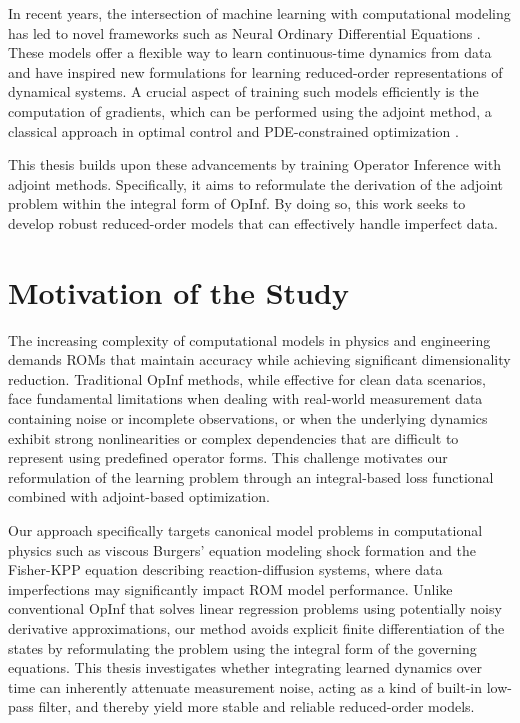 In recent years, the intersection of machine learning with computational modeling has led to novel frameworks such as Neural Ordinary Differential Equations \cite{chen2018neural}. These models offer a flexible way to learn continuous-time dynamics from data and have inspired new formulations for learning reduced-order representations of dynamical systems. A crucial aspect of training such models efficiently is the computation of gradients, which can be performed using the adjoint method, a classical approach in optimal control and PDE-constrained optimization \cite{Antil2018,bradley2024pde}.

This thesis builds upon these advancements by training Operator Inference with adjoint methods. Specifically, it aims to reformulate the derivation of the adjoint problem within the integral form of OpInf. By doing so, this work seeks to develop robust reduced-order models that can effectively handle imperfect data.

\section{Motivation of the Study}

The increasing complexity of computational models in physics and engineering demands ROMs that maintain accuracy while achieving significant dimensionality reduction. Traditional OpInf methods, while effective for clean data scenarios, face fundamental limitations when dealing with real-world measurement data containing noise or incomplete observations, or when the underlying dynamics exhibit strong nonlinearities or complex dependencies that are difficult to represent using predefined operator forms. This challenge motivates our reformulation of the learning problem through an integral-based loss functional combined with adjoint-based optimization.

Our approach specifically targets canonical model problems in computational physics such as viscous Burgers' equation modeling shock formation and the Fisher-KPP equation describing reaction-diffusion systems, where data imperfections may significantly impact ROM model performance. Unlike conventional OpInf that solves linear regression problems using potentially noisy derivative approximations, our method avoids explicit finite differentiation of the states by reformulating the problem using the integral form of the governing equations. This thesis investigates whether integrating learned dynamics over time can inherently attenuate measurement noise, acting as a kind of built-in low-pass filter, and thereby yield more stable and reliable reduced-order models.


